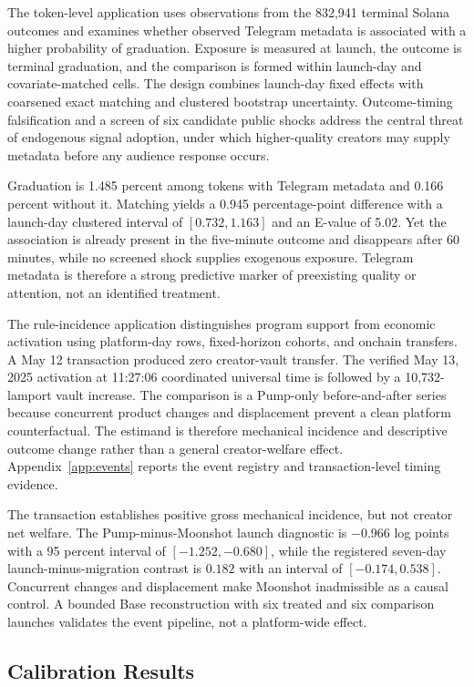 \documentclass{article}
\begin{document}
The token-level application uses observations from the 832,941 terminal Solana outcomes and examines whether observed Telegram metadata is associated with a higher probability of graduation. Exposure is measured at launch, the outcome is terminal graduation, and the comparison is formed within launch-day and covariate-matched cells. The design combines launch-day fixed effects with coarsened exact matching and clustered bootstrap uncertainty. Outcome-timing falsification and a screen of six candidate public shocks address the central threat of endogenous signal adoption, under which higher-quality creators may supply metadata before any audience response occurs.

Graduation is 1.485 percent among tokens with Telegram metadata and 0.166 percent without it. Matching yields a 0.945 percentage-point difference with a launch-day clustered interval of $[0.732,1.163]$ and an E-value of 5.02. Yet the association is already present in the five-minute outcome and disappears after 60 minutes, while no screened shock supplies exogenous exposure. Telegram metadata is therefore a strong predictive marker of preexisting quality or attention, not an identified treatment.

The rule-incidence application distinguishes program support from economic activation using platform-day rows, fixed-horizon cohorts, and onchain transfers. A May 12 transaction produced zero creator-vault transfer. The verified May 13, 2025 activation at 11:27:06 coordinated universal time is followed by a 10,732-lamport vault increase. The comparison is a Pump-only before-and-after series because concurrent product changes and displacement prevent a clean platform counterfactual. The estimand is therefore mechanical incidence and descriptive outcome change rather than a general creator-welfare effect. Appendix~\ref{app:events} reports the event registry and transaction-level timing evidence.

The transaction establishes positive gross mechanical incidence, but not creator net welfare. The Pump-minus-Moonshot launch diagnostic is $-0.966$ log points with a 95 percent interval of $[-1.252,-0.680]$, while the registered seven-day launch-minus-migration contrast is $0.182$ with an interval of $[-0.174,0.538]$. Concurrent changes and displacement make Moonshot inadmissible as a causal control. A bounded Base reconstruction with six treated and six comparison launches validates the event pipeline, not a platform-wide effect.

\subsection{Calibration Results}
\label{sec:reasoning-calibration}
\end{document}
